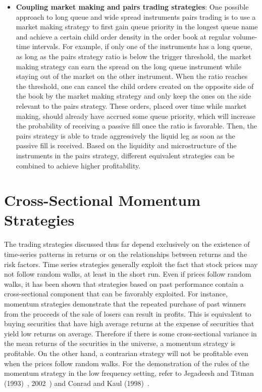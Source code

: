 \begin{itemize}
\item \textbf{Coupling market making and pairs trading strategies}: One possible approach to long queue and wide spread instruments pairs trading is to use a market making strategy to first gain queue priority in the longest queue name and achieve a certain child order density in the order book at regular volume-time intervals. For example, if only one of the instruments has a long queue, as long as the pairs strategy ratio is below the trigger threshold, the market making strategy can earn the spread on the long queue instrument while staying out of the market on the other instrument. When the ratio reaches the threshold, one can cancel the child orders created on the opposite side of the book by the market making strategy and only keep the ones on the side relevant to the pairs strategy. These orders, placed over time while market making, should already have accrued some queue priority, which will increase the probability of receiving a passive fill once the ratio is favorable. Then, the pairs strategy is able to trade aggressively the liquid leg as soon as the passive fill is received. Based on the liquidity and microstructure of the instruments in the pairs strategy, different equivalent strategies can be combined to achieve higher profitability.
\end{itemize}


\section{Cross-Sectional Momentum Strategies}


The trading strategies discussed thus far depend exclusively on the existence of time-series patterns in returns or on the relationships between returns and the risk factors. Time series strategies generally exploit the fact that stock prices may not follow random walks, at least in the short run. Even if prices follow random walks, it has been shown that strategies based on past performance contain a cross-sectional component that can be favorably exploited. For instance, momentum strategies demonstrate that the repeated purchase of past winners from the proceeds of the sale of losers can result in profits. This is equivalent to buying securities that have high average returns at the expense of securities that yield low returns on average. Therefore if there is some cross-sectional variance in the mean returns of the securities in the universe, a momentum strategy is profitable. On the other hand, a contrarian strategy will not be profitable even when the prices follow random walks. For the demonstration of the rules of the momentum strategy in the low frequency setting, refer to Jegadeesh and Titman (1993)~\cite{JeTit1993}, 2002~\cite{JeTit}) and Conrad and Kaul (1998)~\cite{conrad1998}.


